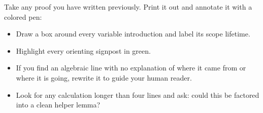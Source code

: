 \begin{labbox}
Take any proof you have written previously. Print it out and annotate it with a colored pen:
\begin{itemize}
\item Draw a box around every variable introduction and label its scope lifetime.
\item Highlight every orienting signpost in green.
\item If you find an algebraic line with no explanation of where it came from or where it is going, rewrite it to guide your human reader.
\item Look for any calculation longer than four lines and ask: could this be factored into a clean helper lemma?
\end{itemize}
\end{labbox}

